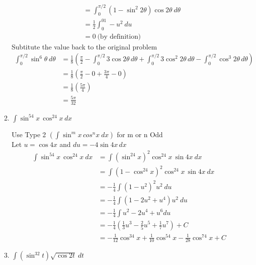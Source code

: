 \documentclass[12pt]{article}
\begin{document}
\begin{enumerate}
\begin{equation*}
\begin{aligned}
  &= \int_0^{\pi/2}(1-\sin^{2}2\theta)\cos2\theta\ d\theta \\
  &= \frac{1}{2}\int_0^01-u^2 \ du \\
  &= 0\ \text{(by definition)}
  \end{aligned}
\end{equation*}
Subtitute the value back to the original problem
\begin{equation*}
  \begin{aligned}
  \int_0^{\pi/2} \sin ^6 \theta \ d\theta &= \frac{1}{8} \left(\frac{\pi}{2}-\int_0^{\pi/2}3\cos2\theta\, d\theta + \int_0^{\pi/2}3\cos^{2}2\theta\,d\theta - \int_0^{\pi/2}\cos^{3}2\theta\,d\theta \right)\\
  &= \frac{1}{8} \left(\frac{\pi}{2}-0+\frac{3\pi}{4}-0\right) \\
  &= \frac{1}{8} \left(\frac{5\pi}{4}\right) \\
  &= \frac{5\pi}{32}
  \end{aligned}
\end{equation*}

\item $\displaystyle\int \sin^54x\,\cos^24x\ dx$

Use Type 2 $\left(\int \sin^mx\,cos^nx \ dx \right)$ for m or n Odd \\
Let $u=\cos4x$ and $du=-4\sin4x\,dx$
\begin{equation*}
  \begin{aligned}
  \int \sin^54x\,\cos^24x\ dx &= \int (\sin^24x)^2\cos^24x\,\sin4x\ dx \\
  &= \int (1-\cos^24x)^2\cos^24x\,\sin4x \ dx \\
  &= -\frac{1}{4}\int(1-u^2)^2u^2 \ du \\
  &= -\frac{1}{4}\int(1-2u^2+u^4)u^2 \ du \\
  &= -\frac{1}{4}\int u^2-2u^4+u^6 du \\
  &=  -\frac{1}{4}\left(\frac{1}{3}u^3-\frac{2}{5}u^5+\frac{1}{7}u^7\right) + C \\
  &= -\frac{1}{12}\cos^34x+\frac{1}{10}\cos^54x-\frac{1}{28}\cos^74x + C
  \end{aligned}
\end{equation*}

\item $\displaystyle\int (\sin^32t)\sqrt{\cos2t}\ dt$


\end{enumerate}
\end{document}

